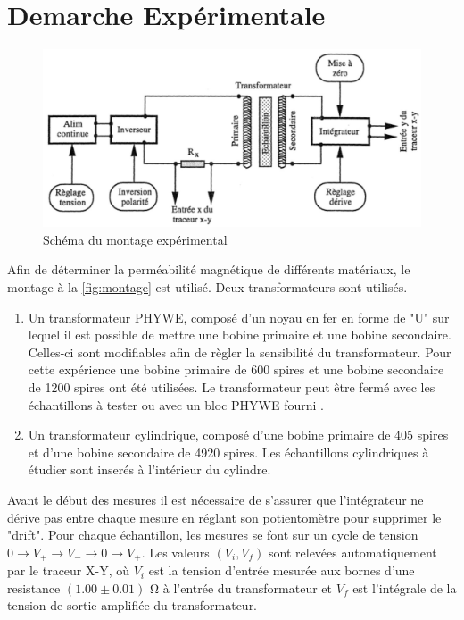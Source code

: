 \section{Demarche Expérimentale}

\begin{figure}[h]
    \centering
    \includegraphics[width=0.8\linewidth]{figures/montage.png}
    \caption{Schéma du montage expérimental \cite{notice}}
    \label{fig:montage}
\end{figure}

Afin de déterminer la perméabilité magnétique de différents matériaux, le montage à la \autoref{fig:montage} est utilisé. Deux transformateurs sont utilisés.

\begin{enumerate}
    \item Un transformateur PHYWE, composé d'un noyau en fer en forme de "U" sur lequel il est possible de mettre une bobine primaire et une bobine secondaire. Celles-ci sont modifiables afin de règler la sensibilité du transformateur. Pour cette expérience une bobine primaire de 600 spires et une bobine secondaire de 1200 spires ont été utilisées. Le transformateur peut être fermé avec les échantillons à tester ou avec un bloc PHYWE fourni \cite{bloc_phywe}.
    \item Un transformateur cylindrique, composé d'une bobine primaire de 405 spires et d'une bobine secondaire de 4920 spires. Les échantillons cylindriques à étudier sont inserés à l'intérieur du cylindre.
\end{enumerate}

Avant le début des mesures il est nécessaire de s'assurer que l'intégrateur ne dérive pas entre chaque mesure en réglant son potientomètre pour supprimer le "drift". Pour chaque échantillon, les mesures se font sur un cycle de tension \(0 \rightarrow V_+ \rightarrow V_- \rightarrow 0 \rightarrow V_+\). Les valeurs \((V_i, V_f)\) sont relevées automatiquement par le traceur X-Y, où \(V_i\) est la tension d'entrée mesurée aux bornes d'une resistance \((1.00 \pm 0.01)\) \si{\ohm} à l'entrée du transformateur et \(V_f\) est l'intégrale de la tension de sortie amplifiée du transformateur.